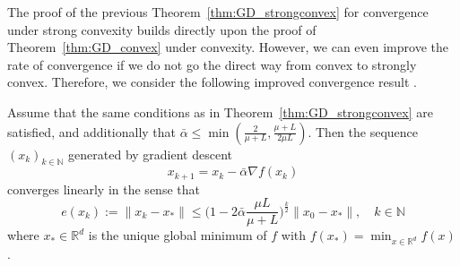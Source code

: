 \documentclass[12pt,openany]{book}
\theoremstyle{definition}
\theoremstyle{definition}
\newcommand{\N}{\mathbb{N}}
\newcommand{\R}{\mathbb{R}}
\begin{document}
The proof of the previous Theorem~\ref{thm:GD_strongconvex} for convergence under strong convexity builds directly upon the proof of Theorem~\ref{thm:GD_convex} under convexity.  However, we can even improve the rate of convergence if we do not go the direct way from convex to strongly convex. Therefore, we consider the following improved convergence result \cite[Theorem~2.1.15]{N2018}.

\begin{thm}\label{thm:GD_strongconvex2}
Assume that the same conditions as in Theorem~\ref{thm:GD_strongconvex} are satisfied, and additionally that $\bar\alpha\le \min(\frac{2}{\mu+L},\frac{\mu+L}{2\mu L})$. Then the sequence $(x_k)_{k\in\N}$ generated by gradient descent
\[x_{k+1} = x_k - \bar\alpha \nabla f(x_k) \]
 converges linearly in the sense that 
\[e(x_k):=\|x_k-x_\ast\| \le \Big(1-2\bar\alpha \frac{\mu L}{\mu+L}\Big)^{\frac{k}{2}}\|x_0-x_\ast\|,\quad k\in\N\]
where $x_\ast\in\R^d$ is the unique global minimum of $f$ with $f(x_\ast) = \min_{x\in\R^d} f(x)$. 
\end{thm}
\end{document}
